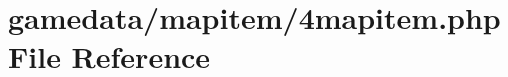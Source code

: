 \hypertarget{4mapitem_8php}{\section{gamedata/mapitem/4mapitem.php File Reference}
\label{4mapitem_8php}
}
